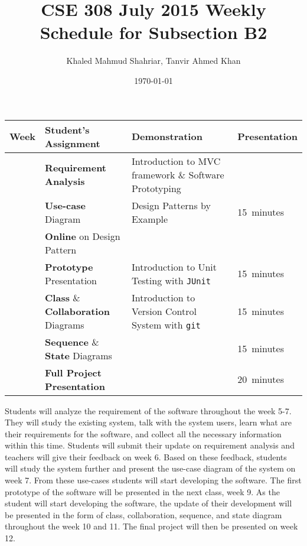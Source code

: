 \documentclass[paper=a4, fontsize=11pt]{scrartcl}
\title{CSE 308 July 2015 Weekly Schedule for Subsection B2}
\author{Khaled Mahmud Shahriar, Tanvir Ahmed Khan}
\date{\today}
\newcommand{\xmark}{\ding{55}}
\begin{document}
\maketitle

\renewcommand{\arraystretch}{1.3}
\begin{center}
    \begin{tabular}{|>{\centering\arraybackslash}m{}|>{\centering\arraybackslash}m{}|>{\centering\arraybackslash}m{}|>{\centering\arraybackslash}m{}|}
    \hline
    \textbf{Week} & \textbf{Student's Assignment} & \textbf{Demonstration} & \textbf{Presentation}\\
    \hline
    6 & \textbf{Requirement Analysis} & Introduction to MVC framework \& Software Prototyping & \xmark\\
    \hline
    7 & \textbf{Use-case} Diagram & Design Patterns by Example & \SI{15}{minutes}\\
    \hline
    8 & \textbf{Online} on Design Pattern & \xmark & \xmark\\
    \hline
    9 & \textbf{Prototype} Presentation & Introduction to Unit Testing with \texttt{JUnit} & \SI{15}{minutes}\\
    \hline
    10 & \textbf{Class} \& \textbf{Collaboration} Diagrams & Introduction to Version Control System with \texttt{git} & \SI{15}{minutes}\\
    \hline
    11 & \textbf{Sequence} \& \textbf{State} Diagrams & \xmark & \SI{15}{minutes}\\
    \hline
    12 & \textbf{Full Project Presentation} & \xmark & \SI{20}{minutes}\\
    \hline
    \end{tabular}
\end{center}
Students will analyze the requirement of the software throughout the week 5-7. They will study the existing system, talk with the system users, learn what are their requirements for the software, and collect all the necessary information within this time. Students will submit their update on requirement analysis and teachers will give their feedback on week 6. Based on these feedback, students will study the system further and present the use-case diagram of the system on week 7. From these use-cases students will start developing the software. The first prototype of the software will be presented in the next class, week 9. As the student will start developing the software, the update of their development will be presented in the form of class, collaboration, sequence, and state diagram throughout the week 10 and 11. The final project will then be presented on week 12.

\iffalse
Few guidelines are-
\begin{itemize}
 \item For use-case diagram, show use-cases for exactly two subsystems. For use-case description, present exactly three use-cases. You should create use-cases for other subsystems as well but you don't have to present them in your presentation.
 \item For prototype design, design the various screens of your software using standard prototyping softwares.
\end{itemize}
\fi
\end{document}
